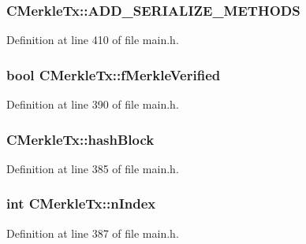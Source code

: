 \subsubsection[{A\+D\+D\+\_\+\+S\+E\+R\+I\+A\+L\+I\+Z\+E\+\_\+\+M\+E\+T\+H\+O\+D\+S}]{\setlength{\rightskip}{0pt plus 5cm}C\+Merkle\+Tx\+::\+A\+D\+D\+\_\+\+S\+E\+R\+I\+A\+L\+I\+Z\+E\+\_\+\+M\+E\+T\+H\+O\+D\+S}\label{class_c_merkle_tx_a86d607a3e47700ed5ebcdd4d4fcda4d7}


Definition at line 410 of file main.\+h.

\hypertarget{class_c_merkle_tx_a3626572f7dbb86eb1c36a6570d740c7f}{}
\subsubsection[{f\+Merkle\+Verified}]{\setlength{\rightskip}{0pt plus 5cm}bool C\+Merkle\+Tx\+::f\+Merkle\+Verified\hspace{0.3cm}{\ttfamily [mutable]}}\label{class_c_merkle_tx_a3626572f7dbb86eb1c36a6570d740c7f}


Definition at line 390 of file main.\+h.

\hypertarget{class_c_merkle_tx_a788ee54c14b6d9706eb3737404663238}{}
\subsubsection[{hash\+Block}]{ C\+Merkle\+Tx\+::hash\+Block}\label{class_c_merkle_tx_a788ee54c14b6d9706eb3737404663238}


Definition at line 385 of file main.\+h.

\hypertarget{class_c_merkle_tx_a829655e70702fdf97b6e534dd3227b0b}{}
\subsubsection[{n\+Index}]{\setlength{\rightskip}{0pt plus 5cm}int C\+Merkle\+Tx\+::n\+Index}\label{class_c_merkle_tx_a829655e70702fdf97b6e534dd3227b0b}


Definition at line 387 of file main.\+h.

\hypertarget{class_c_merkle_tx_a9ae6a408be914f486ebbb4161879ee69}{}
